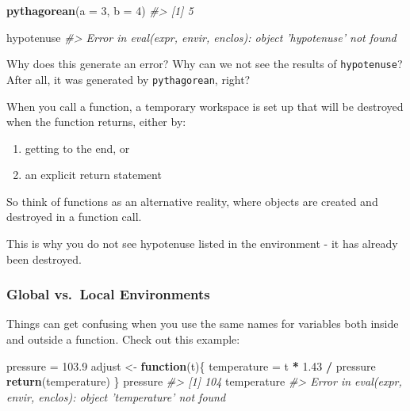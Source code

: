 \documentclass[]{book}
\newenvironment{Shaded}{\begin{snugshade}}{\end{snugshade}}
\newcommand{\CommentTok}[1]{\textcolor[rgb]{0.56,0.35,0.01}{\textit{#1}}}
\newcommand{\ControlFlowTok}[1]{\textcolor[rgb]{0.13,0.29,0.53}{\textbf{#1}}}
\newcommand{\DataTypeTok}[1]{\textcolor[rgb]{0.13,0.29,0.53}{#1}}
\newcommand{\DecValTok}[1]{\textcolor[rgb]{0.00,0.00,0.81}{#1}}
\newcommand{\FloatTok}[1]{\textcolor[rgb]{0.00,0.00,0.81}{#1}}
\newcommand{\KeywordTok}[1]{\textcolor[rgb]{0.13,0.29,0.53}{\textbf{#1}}}
\newcommand{\NormalTok}[1]{#1}
\newcommand{\OperatorTok}[1]{\textcolor[rgb]{0.81,0.36,0.00}{\textbf{#1}}}
\newcommand{\StringTok}[1]{\textcolor[rgb]{0.31,0.60,0.02}{#1}}
\providecommand{\tightlist}{%
  \setlength{\itemsep}{0pt}\setlength{\parskip}{0pt}}
\begin{document}
\begin{Shaded}
\begin{Highlighting}[]
\KeywordTok{pythagorean}\NormalTok{(}\DataTypeTok{a =} \DecValTok{3}\NormalTok{, }\DataTypeTok{b =} \DecValTok{4}\NormalTok{)}
\CommentTok{#> [1] 5}

\NormalTok{hypotenuse}
\CommentTok{#> Error in eval(expr, envir, enclos): object 'hypotenuse' not found}
\end{Highlighting}
\end{Shaded}

Why does this generate an error? Why can we not see the results of \texttt{hypotenuse}? After all, it was generated by \texttt{pythagorean}, right?

When you call a function, a temporary workspace is set up that will be destroyed when the function returns, either by:

\begin{enumerate}
\def\labelenumi{\arabic{enumi}.}
\tightlist
\item
  getting to the end, or
\item
  an explicit return statement
\end{enumerate}

So think of functions as an alternative reality, where objects are created and destroyed in a function call.

This is why you do not see hypotenuse listed in the environment - it has already been destroyed.

\hypertarget{global-vs.local-environments}{%
\subsubsection*{Global vs.~Local Environments}\label{global-vs.local-environments}}

Things can get confusing when you use the same names for variables both inside and outside a function. Check out this example:

\begin{Shaded}
\begin{Highlighting}[]
\NormalTok{pressure =}\StringTok{ }\FloatTok{103.9}
\NormalTok{adjust <-}\StringTok{ }\ControlFlowTok{function}\NormalTok{(t)\{}
\NormalTok{    temperature =}\StringTok{ }\NormalTok{t }\OperatorTok{*}\StringTok{ }\FloatTok{1.43} \OperatorTok{/}\StringTok{ }\NormalTok{pressure}
    \KeywordTok{return}\NormalTok{(temperature)}
\NormalTok{\}}
\NormalTok{pressure}
\CommentTok{#> [1] 104}
\NormalTok{temperature}
\CommentTok{#> Error in eval(expr, envir, enclos): object 'temperature' not found}
\end{Highlighting}
\end{Shaded}
\end{document}
